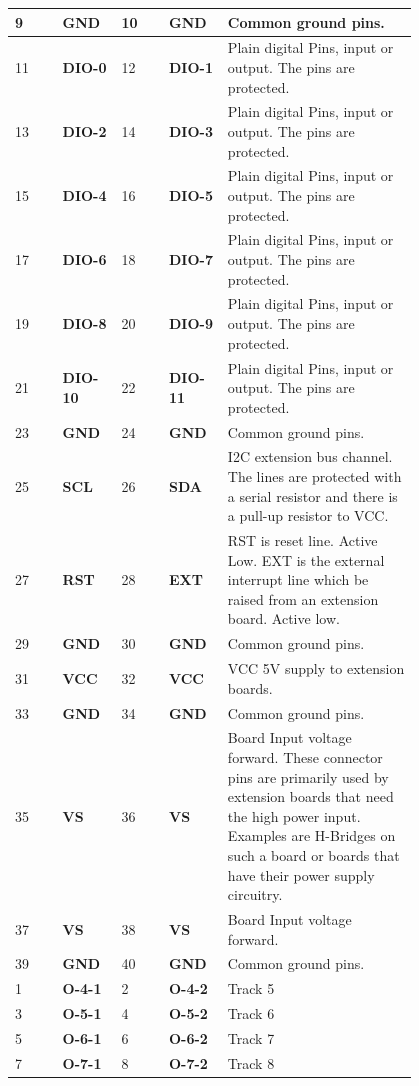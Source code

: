 \begin{longtable}{@{}|p{0.1\linewidth}|p{0.1\linewidth}|p{0.1\linewidth}|p{0.1\linewidth}|p{0.4\linewidth}|@{}}
    \midrule
    9 & \textbf{GND} & 10 & \textbf{GND} & Common ground pins. \\
    \midrule
    11 & \textbf{DIO-0} & 12 & \textbf{DIO-1} & Plain digital Pins, input or output. The pins are protected. \\
    \midrule
    13 & \textbf{DIO-2} & 14 & \textbf{DIO-3} & Plain digital Pins, input or output. The pins are protected. \\
    \midrule
    15 & \textbf{DIO-4} & 16 & \textbf{DIO-5} & Plain digital Pins, input or output. The pins are protected. \\
    \midrule
    17 & \textbf{DIO-6} & 18 & \textbf{DIO-7} & Plain digital Pins, input or output. The pins are protected. \\
    \midrule
    19 & \textbf{DIO-8} & 20 & \textbf{DIO-9} & Plain digital Pins, input or output. The pins are protected. \\
    \midrule
    21 & \textbf{DIO-10} & 22 & \textbf{DIO-11} & Plain digital Pins, input or output. The pins are protected. \\
    \midrule
    23 & \textbf{GND} & 24 & \textbf{GND} & Common ground pins. \\
    \midrule
    25 & \textbf{SCL} & 26 & \textbf{SDA} & I2C extension bus channel.  The lines are protected with a serial resistor and there is a pull-up resistor to VCC. \\
    \midrule
    27 & \textbf{RST} & 28 & \textbf{EXT} & RST is reset line. Active Low. EXT is the external interrupt line which be raised from an extension board. Active low. \\
    \midrule
    29 & \textbf{GND} & 30 & \textbf{GND} & Common ground pins. \\
    \midrule
    31 & \textbf{VCC} & 32 & \textbf{VCC} & VCC 5V supply to extension boards. \\
    \midrule
    33 & \textbf{GND} & 34 & \textbf{GND} & Common ground pins. \\
    \midrule
    35 & \textbf{VS} & 36 & \textbf{VS} & Board Input voltage forward. These  connector pins are primarily used by extension boards that need the high power input. Examples  are H-Bridges on such a board or boards that have their power supply circuitry. \\
    \midrule
    37 & \textbf{VS} & 38 & \textbf{VS} & Board Input voltage forward. \\
    \midrule
    39 & \textbf{GND} & 40 & \textbf{GND} & Common ground pins. \\
    \midrule
    \midrule
    \midrule
    1 & \textbf{O-4-1} & 2 & \textbf{O-4-2} & Track 5 \\
    \midrule
    3 & \textbf{O-5-1} & 4 & \textbf{O-5-2} & Track 6 \\
    \midrule
    5 & \textbf{O-6-1} & 6 & \textbf{O-6-2} & Track 7 \\
    \midrule
    7 & \textbf{O-7-1} & 8 & \textbf{O-7-2} & Track 8 \\
    \midrule
\end{longtable}  


